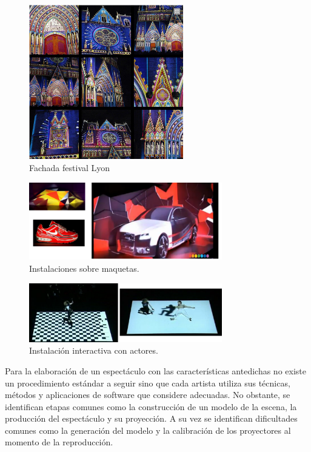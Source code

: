 \begin{figure}[H]
  \centering
    \includegraphics[width=0.6\textwidth]{./Cap1_intro/Fachada1.png}
  \caption[http://www.weltlighting.com/]{Fachada festival Lyon}
  \label{fig:Fachada1}
\end{figure}

\begin{figure}[H]
  \centering
    \includegraphics[width=0.75\textwidth]{./Cap1_intro/instalacion3.png}
	\caption[http://media.radugadesign.com,http://blog.naver.com/eyetive,http://www.weltlighting.com/fragment]{Instalaciones sobre maquetas.}
  \label{fig:Instalacion}
\end{figure}

\begin{figure}[H]
  \centering
    \includegraphics[width=0.75\textwidth]{./Cap1_intro/instalacionHumano1.png}
  \caption[http://www.mndl.hu/nos]{Instalación interactiva con actores.}
  \label{fig:Interactiva}
\end{figure}

Para la elaboración de un espectáculo con las características antedichas no existe un procedimiento estándar a seguir sino que cada artista utiliza sus técnicas, métodos y aplicaciones de software que considere adecuadas. No obstante, se identifican etapas comunes como la construcción de un modelo de la escena, la producción del espectáculo y su proyección. A su vez se identifican dificultades comunes como la generación del modelo y la calibración de los proyectores al momento de la reproducción.

